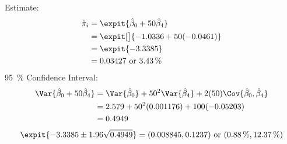 \documentclass[oneside]{book}\usepackage[]{graphicx}\usepackage[svgnames]{xcolor}
\begin{document}
Estimate:
\begin{align*}
      \hat{\pi}_i
       & =\expit{\hat{\beta}_0+50\hat{\beta}_4}   \\
       & =\expit[\big]{-1.0336 + 50(-0.0461)}     \\
       & =\expit{-3.3385}                         \\
       & =0.03427\text{ or } \qty{3.43}{\percent}
\end{align*}
\qty{95}{\percent} Confidence Interval:
\begin{align*}
      \Var{\hat{\beta}_0+50\hat{\beta}_4}
       & =\Var{\hat{\beta}_0}+50^2\Var{\hat{\beta}_4}+2(50)\Cov{\hat{\beta}_0,\hat{\beta}_4} \\
       & =2.579 + 50^2 (0.001176) + 100(-0.05203)                                            \\
       & =0.4949
\end{align*}
\[ \expit{-3.3385 \pm 1.96 \sqrt{0.4949}}=(0.008845, 0.1237) \text{ or }(\qty{0.88}{\percent}, \qty{12.37}{\percent}) \]
\end{document}
